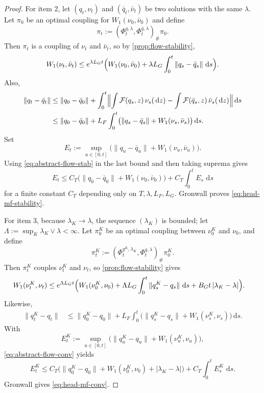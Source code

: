 \documentclass{article}
\theoremstyle{definition}
\newcommand{\W}{W_1}
\newcommand{\dd}{\,\mathrm{d}}
\begin{document}
\begin{proof}
For item 2, let $(q_t,\nu_t)$ and $(\bar q_t,\bar\nu_t)$ be two solutions with the same $\lambda$. Let $\pi_0$ be an optimal coupling for $\W(\nu_0,\bar\nu_0)$ and define
\[
  \pi_t:=
  (\Phi_t^{q,\lambda},\Phi_t^{\bar q,\lambda})_\#\pi_0.
\]
Then $\pi_t$ is a coupling of $\nu_t$ and $\bar\nu_t$, so by \cref{prop:flow-stability},
\begin{equation}
  \W(\nu_t,\bar\nu_t)
  \le
  e^{\lambda L_G t}
  \Bigl(
    \W(\nu_0,\bar\nu_0)
    +
    \lambda L_G\int_0^t \|q_s-\bar q_s\|\,\dd s
  \Bigr).
  \label{eq:abstract-flow-stab}
\end{equation}
Also,
\begin{align*}
  \|q_t-\bar q_t\|
  &\le
  \|q_0-\bar q_0\|
  +
  \int_0^t
  \Bigl\|
    \int \mathcal F(q_s,z)\,\nu_s(\dd z)
    -
    \int \mathcal F(\bar q_s,z)\,\bar\nu_s(\dd z)
  \Bigr\|
  \dd s
  \\
  &\le
  \|q_0-\bar q_0\|
  +
  L_F\int_0^t
  \bigl(
    \|q_s-\bar q_s\|+\W(\nu_s,\bar\nu_s)
  \bigr)\dd s.
\end{align*}
Set
\[
  E_t:=\sup_{u\in[0,t]}\bigl(\|q_u-\bar q_u\|+\W(\nu_u,\bar\nu_u)\bigr).
\]
Using \eqref{eq:abstract-flow-stab} in the last bound and then taking suprema gives
\[
  E_t
  \le
  C_T
  \bigl(
    \|q_0-\bar q_0\|+\W(\nu_0,\bar\nu_0)
  \bigr)
  +
  C_T\int_0^t E_s\,\dd s
\]
for a finite constant $C_T$ depending only on $T,\lambda,L_F,L_G$. Gronwall proves \eqref{eq:head-mf-stability}.

For item 3, because $\lambda_K\to\lambda$, the sequence $(\lambda_K)$ is bounded; let $\Lambda:=\sup_K\lambda_K\vee\lambda<\infty$. Let $\pi_0^K$ be an optimal coupling between $\nu_0^K$ and $\nu_0$, and define
\[
  \pi_t^K:=
  (\Phi_t^{q^K,\lambda_K},\Phi_t^{q,\lambda})_\#\pi_0^K.
\]
Then $\pi_t^K$ couples $\nu_t^K$ and $\nu_t$, so \cref{prop:flow-stability} gives
\begin{align}
  \W(\nu_t^K,\nu_t)
  &\le
  e^{\Lambda L_G t}
  \Bigl(
    \W(\nu_0^K,\nu_0)
    +
    \Lambda L_G\int_0^t \|q_s^K-q_s\|\,\dd s
    +
    B_G t\,|\lambda_K-\lambda|
  \Bigr).
  \label{eq:abstract-flow-conv}
\end{align}
Likewise,
\begin{align*}
  \|q_t^K-q_t\|
  &\le
  \|q_0^K-q_0\|
  +
  L_F\int_0^t
  \bigl(
    \|q_s^K-q_s\|+\W(\nu_s^K,\nu_s)
  \bigr)\dd s.
\end{align*}
With
\[
  E_t^K:=\sup_{u\in[0,t]}\bigl(\|q_u^K-q_u\|+\W(\nu_u^K,\nu_u)\bigr),
\]
\eqref{eq:abstract-flow-conv} yields
\[
  E_t^K
  \le
  C_T
  \bigl(
    \|q_0^K-q_0\|+\W(\nu_0^K,\nu_0)+|\lambda_K-\lambda|
  \bigr)
  +
  C_T\int_0^t E_s^K\,\dd s.
\]
Gronwall gives \eqref{eq:head-mf-conv}.
\end{proof}
\end{document}
